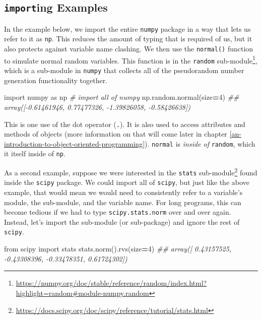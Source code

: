 \documentclass[
  12pt,
  krantz2]{krantz}
\makeatletter
\newenvironment{Shaded}{\begin{snugshade}}{\end{snugshade}}
\newcommand{\CommentTok}[1]{\textcolor[rgb]{0.37,0.37,0.37}{\textit{#1}}}
\newcommand{\DecValTok}[1]{\textcolor[rgb]{0.06,0.06,0.06}{#1}}
\newcommand{\ImportTok}[1]{#1}
\newcommand{\NormalTok}[1]{#1}
\newcommand{\OperatorTok}[1]{\textcolor[rgb]{0.43,0.43,0.43}{\textbf{#1}}}
\renewcommand{\href}[2]{#2\footnote{\url{#1}}}
\newenvironment{kframe}{%
\medskip{}
\setlength{\fboxsep}{.8em}
 \def\at@end@of@kframe{}%
 \ifinner\ifhmode%
  \def\at@end@of@kframe{\end{minipage}}%
  \begin{minipage}{\columnwidth}%
 \fi\fi%
 \def\FrameCommand##1{\hskip\@totalleftmargin \hskip-\fboxsep
 \colorbox{shadecolor}{##1}\hskip-\fboxsep
     \hskip-\linewidth \hskip-\@totalleftmargin \hskip\columnwidth}%
 \MakeFramed {\advance\hsize-\width
   \@totalleftmargin\z@ \linewidth\hsize
   \@setminipage}}%
 {\par\unskip\endMakeFramed%
 \at@end@of@kframe}
\renewenvironment{Shaded}{\begin{kframe}}{\end{kframe}}
\makeatother
\begin{document}
\hypertarget{importing-examples}{%
\subsection{\texorpdfstring{\texttt{import}ing Examples}{importing Examples}}\label{importing-examples}}

In the example below, we import the entire \texttt{numpy} package in a way that lets us refer to it as \texttt{np}. This reduces the amount of typing that is required of us, but it also protects against variable name clashing. We then use the \texttt{normal()} function to simulate normal random variables. This function is in the \href{https://numpy.org/doc/stable/reference/random/index.html?highlight=random\#module-numpy.random}{\texttt{random} sub-module}, which is a sub-module in \texttt{numpy} that collects all of the pseudorandom number generation functionality together.

\begin{Shaded}
\begin{Highlighting}[]
\ImportTok{import}\NormalTok{ numpy }\ImportTok{as}\NormalTok{ np }\CommentTok{\# import all of numpy}
\NormalTok{np.random.normal(size}\OperatorTok{=}\DecValTok{4}\NormalTok{)}
\CommentTok{\#\# array([{-}0.61461946,  0.77477326, {-}1.39826058, {-}0.58426638])}
\end{Highlighting}
\end{Shaded}

This is one use of the dot operator (\texttt{.}). It is also used to access attributes and methods of objects (more information on that will come later in chapter \ref{an-introduction-to-object-oriented-programming}). \texttt{normal} is \emph{inside of} \texttt{random}, which it itself inside of \texttt{np}.

As a second example, suppose we were interested in the \href{https://docs.scipy.org/doc/scipy/reference/tutorial/stats.html}{\texttt{stats} sub-module} found inside the \texttt{scipy} package. We could import all of \texttt{scipy}, but just like the above example, that would mean we would need to consistently refer to a variable's module, the sub-module, and the variable name. For long programs, this can become tedious if we had to type \texttt{scipy.stats.norm} over and over again. Instead, let's import the sub-module (or sub-package) and ignore the rest of \texttt{scipy}.

\begin{Shaded}
\begin{Highlighting}[]
\ImportTok{from}\NormalTok{ scipy }\ImportTok{import}\NormalTok{ stats}
\NormalTok{stats.norm().rvs(size}\OperatorTok{=}\DecValTok{4}\NormalTok{)}
\CommentTok{\#\# array([ 0.43157525, {-}0.43308396, {-}0.33478351,  0.61724302])}
\end{Highlighting}
\end{Shaded}
\end{document}
